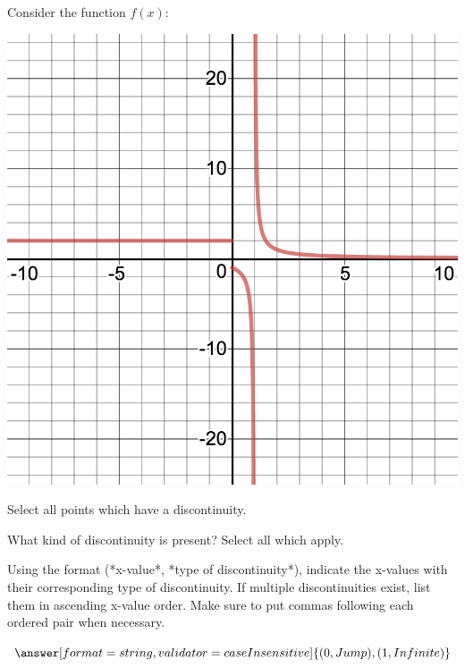 \documentclass{ximera}
\begin{document}
\begin{question}
Consider the function $f(x)$:
\begin{image}
\includegraphics{continuity4}
\end{image}
Select all points which have a discontinuity.

\begin{selectAll}
\end{selectAll}

What kind of discontinuity is present? Select all which apply.

\begin{selectAll}
\end{selectAll}

Using the format (*x-value*, *type of discontinuity*), indicate the x-values with their corresponding type of discontinuity. If multiple discontinuities exist, list them in ascending x-value order. Make sure to put commas following each ordered pair when necessary.

$\answer[format=string,validator=caseInsensitive]{(0, Jump), (1, Infinite)}$
\end{question}
\end{document}

